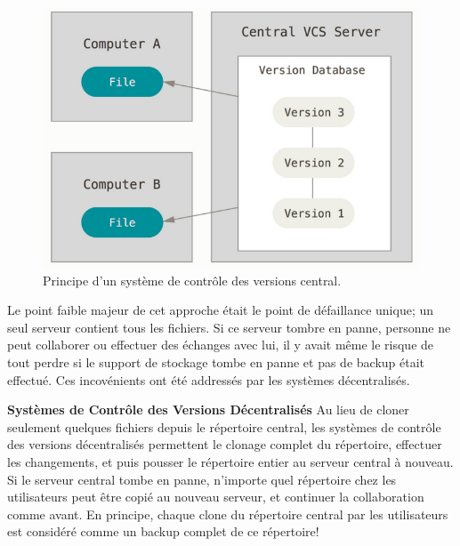 \begin{figure}[H]
    \centering
    \includegraphics[width=12cm]{images/central-scm.png}
    \caption{Principe d'un système de contrôle des versions central.}
    \label{fig:central-scm}
\end{figure}

Le point faible majeur de cet approche était le point de défaillance unique; un seul serveur contient tous les fichiers. Si ce serveur tombre en panne, personne ne peut collaborer ou effectuer des échanges avec lui, il y avait même le risque de tout perdre si le support de stockage tombe en panne et pas de backup était effectué. Ces incovénients ont été addressés par les systèmes décentralisés.
\newline

\textbf{Systèmes de Contrôle des Versions Décentralisés} \newline
Au lieu de cloner seulement quelques fichiers depuis le répertoire central, les systèmes de contrôle des versions décentralisés permettent le clonage complet du répertoire, effectuer les changements, et puis pousser le répertoire entier au serveur central à nouveau. Si le serveur central tombe en panne, n’importe quel répertoire chez les utilisateurs peut être copié au nouveau serveur, et continuer la collaboration comme avant. En principe, chaque clone du répertoire central par les utilisateurs est considéré comme un backup complet de ce répertoire!

